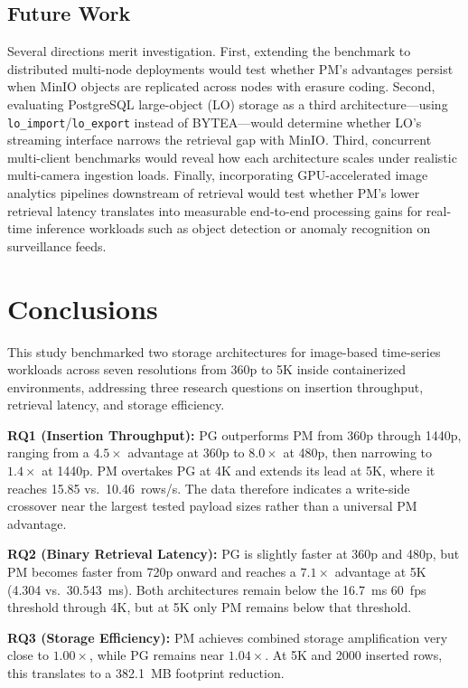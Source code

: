 \documentclass[conference, a4paper]{IEEEtran}
\begin{document}
\subsection{Future Work}
Several directions merit investigation. First, extending the benchmark to distributed multi-node deployments would test whether PM's advantages persist when MinIO objects are replicated across nodes with erasure coding. Second, evaluating PostgreSQL large-object (LO) storage as a third architecture---using \texttt{lo\_import}/\texttt{lo\_export} instead of BYTEA---would determine whether LO's streaming interface narrows the retrieval gap with MinIO. Third, concurrent multi-client benchmarks would reveal how each architecture scales under realistic multi-camera ingestion loads. Finally, incorporating GPU-accelerated image analytics pipelines downstream of retrieval would test whether PM's lower retrieval latency translates into measurable end-to-end processing gains for real-time inference workloads such as object detection or anomaly recognition on surveillance feeds.

\section{Conclusions}
\label{sec:conclusions}

This study benchmarked two storage architectures for image-based time-series workloads across seven resolutions from 360p to 5K inside containerized environments, addressing three research questions on insertion throughput, retrieval latency, and storage efficiency.

\textbf{RQ1 (Insertion Throughput):} PG outperforms PM from 360p through 1440p, ranging from a $4.5\times$ advantage at 360p to $8.0\times$ at 480p, then narrowing to $1.4\times$ at 1440p. PM overtakes PG at 4K and extends its lead at 5K, where it reaches 15.85 vs.\ 10.46~rows/s. The data therefore indicates a write-side crossover near the largest tested payload sizes rather than a universal PM advantage.

\textbf{RQ2 (Binary Retrieval Latency):} PG is slightly faster at 360p and 480p, but PM becomes faster from 720p onward and reaches a $7.1\times$ advantage at 5K (4.304 vs.\ 30.543~ms). Both architectures remain below the 16.7~ms 60~fps threshold through 4K, but at 5K only PM remains below that threshold.

\textbf{RQ3 (Storage Efficiency):} PM achieves combined storage amplification very close to $1.00\times$, while PG remains near $1.04\times$. At 5K and 2000 inserted rows, this translates to a 382.1~MB footprint reduction.
\end{document}
